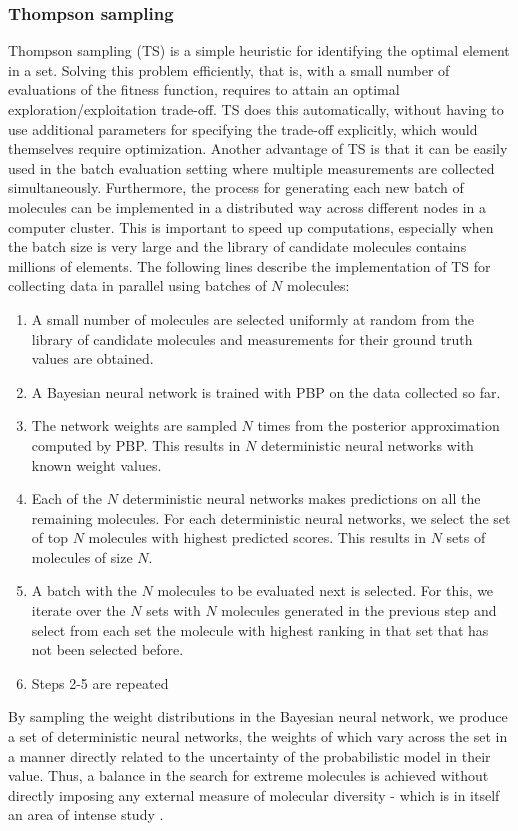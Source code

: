 \subsubsection{Thompson sampling}

Thompson sampling (TS) \cite{Thompson_1933} is a simple heuristic for identifying the optimal element in a set. Solving this problem efficiently, that is, with a small number of evaluations of the fitness function, requires to attain an optimal exploration/exploitation trade-off. TS does this automatically, without having to use additional parameters for specifying the trade-off explicitly, which would themselves require optimization. Another advantage of TS is that it can be easily used
in the batch evaluation setting where multiple measurements are collected simultaneously. Furthermore, the process for generating each new batch of molecules can be implemented in a distributed way across different nodes in a computer cluster. This is important to speed up computations, especially when the batch size is very large and the library of candidate molecules contains millions of elements. The following lines describe the implementation of TS for collecting data in parallel using batches of $N$ molecules:
\begin{enumerate}
\item A small number of molecules are selected uniformly at random from the library of candidate molecules and measurements for their ground truth values are obtained.
\item A Bayesian neural network is trained with PBP on the data collected so far.
\item The network weights are sampled $N$ times from the posterior approximation computed by PBP. This results in $N$ deterministic neural networks with known weight values. 
\item Each of the $N$ deterministic neural networks makes predictions on all the remaining molecules. For each deterministic neural networks, we select the set of top $N$ molecules with highest predicted scores. This results in $N$ sets of molecules of size $N$.
\item A batch with the $N$ molecules to be evaluated next is selected. For this, we iterate over the $N$ sets with $N$ molecules generated in the previous step and select from each set the molecule with highest ranking in that set that has not been selected before.
\item Steps 2-5 are repeated
\end{enumerate}
By sampling the weight distributions in the Bayesian neural network, we produce a set of deterministic neural networks, the weights of which vary across the set in a manner directly related to the uncertainty of the probabilistic model in their value.  Thus, a balance in the search for extreme molecules is achieved without directly imposing any external measure of molecular diversity - which is in itself an area of intense study \cite{Maldonado_2006}.